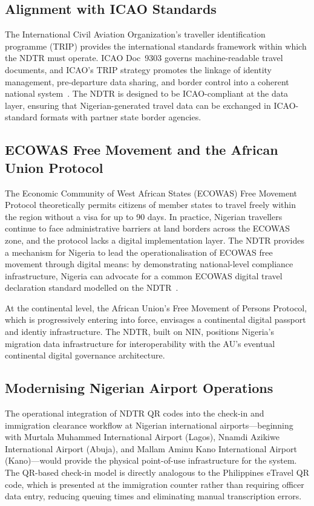 \documentclass[11pt]{article}
\begin{document}
\subsection{Alignment with ICAO Standards}

The International Civil Aviation Organization's traveller identification
programme (TRIP) provides the international standards framework within
which the NDTR must operate. ICAO Doc~9303 governs machine-readable
travel documents, and ICAO's TRIP strategy promotes the linkage of
identity management, pre-departure data sharing, and border control
into a coherent national system~\cite{icao2023}. The NDTR is designed
to be ICAO-compliant at the data layer, ensuring that Nigerian-generated
travel data can be exchanged in ICAO-standard formats with partner
state border agencies.

\subsection{ECOWAS Free Movement and the African Union Protocol}

The Economic Community of West African States (ECOWAS) Free Movement
Protocol theoretically permits citizens of member states to travel
freely within the region without a visa for up to 90 days.
In practice, Nigerian travellers continue to face administrative
barriers at land borders across the ECOWAS zone, and the protocol
lacks a digital implementation layer.
The NDTR provides a mechanism for Nigeria to lead the
operationalisation of ECOWAS free movement through digital means:
by demonstrating national-level compliance infrastructure,
Nigeria can advocate for a common ECOWAS digital travel declaration
standard modelled on the NDTR~\cite{ecowas2022}.

At the continental level, the African Union's Free Movement
of Persons Protocol, which is progressively entering into
force, envisages a continental digital passport and identiy
infrastructure. The NDTR, built on NIN, positions Nigeria's
migration data infrastructure for interoperability with the
AU's eventual continental digital governance architecture.

\subsection{Modernising Nigerian Airport Operations}

The operational integration of NDTR QR codes into the check-in
and immigration clearance workflow at Nigerian international
airports---beginning with Murtala Muhammed International Airport
(Lagos), Nnamdi Azikiwe International Airport (Abuja), and
Mallam Aminu Kano International Airport (Kano)---would provide
the physical point-of-use infrastructure for the system.
The QR-based check-in model is directly analogous to the
Philippines eTravel QR code, which is presented at the immigration
counter rather than requiring officer data entry, reducing
queuing times and eliminating manual transcription errors.
\end{document}
